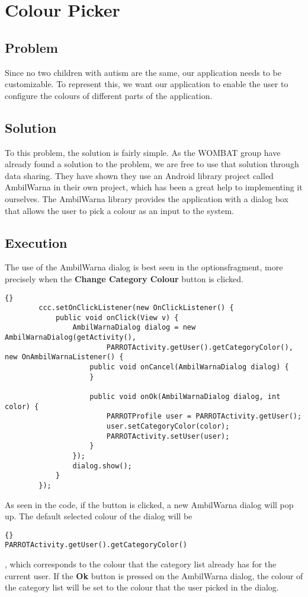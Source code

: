 \section{Colour Picker}%
\subsection{Problem}
Since no two children with autism are the same, our application needs to be customizable. To represent this, we want our application to enable the user to configure the colours of different parts of the application.

\subsection{Solution}
To this problem, the solution is fairly simple. As the WOMBAT group have already found a solution to the problem, we are free to use that solution through data sharing. %
They have shown they use an Android library project called AmbilWarna in their own project, which has been a great help to implementing it ourselves. The AmbilWarna library provides the application with a dialog box that allows the user to pick a colour as an input to the system.

\subsection{Execution}
The use of the AmbilWarna dialog is best seen in the optionsfragment, more precisely when the \textbf{Change Category Colour} button is clicked.

\begin{verbatim}{}
		ccc.setOnClickListener(new OnClickListener() {
			public void onClick(View v) {
				AmbilWarnaDialog dialog = new AmbilWarnaDialog(getActivity(),
						PARROTActivity.getUser().getCategoryColor(), new OnAmbilWarnaListener() {
					public void onCancel(AmbilWarnaDialog dialog) {
					}

					public void onOk(AmbilWarnaDialog dialog, int color) {
						PARROTProfile user = PARROTActivity.getUser();
						user.setCategoryColor(color);
						PARROTActivity.setUser(user);
					}
				});
				dialog.show();
			}
		});
\end{verbatim}

As seen in the code, if the button is clicked, a new AmbilWarna dialog will pop up. The default selected colour of the dialog will be 
\begin{verbatim}{}
PARROTActivity.getUser().getCategoryColor()
\end{verbatim}, which corresponds to the colour that the category list already has for the current user.\newline
If the \textbf{Ok} button is pressed on the AmbilWarna dialog, the colour of the category list will be set to the colour that the user picked in the dialog.

